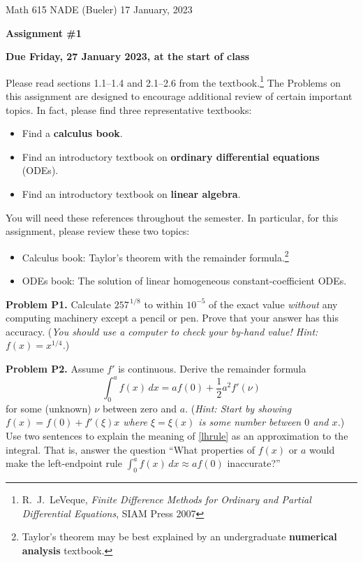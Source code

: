 \documentclass[12pt]{amsart}
\newcommand{\prob}[1]{\bigskip\noindent\textbf{#1}\quad }
\begin{document}
\scriptsize \noindent Math 615 NADE (Bueler) \hfill 17 January, 2023
\normalsize

\medskip\bigskip

\Large\centerline{\textbf{Assignment \#1}}
\large
\bigskip

\centerline{\textbf{Due Friday, 27 January 2023, at the start of class}}
\bigskip
\normalsize

\thispagestyle{empty}

\bigskip
Please read sections 1.1--1.4 and 2.1--2.6 from the textbook.\footnote{R.~J.~LeVeque, \emph{Finite Difference Methods for Ordinary and Partial Differential Equations}, SIAM Press 2007}  The Problems on this assignment are designed to encourage additional review of certain important topics.  In fact, please find three representative textbooks:
\begin{itemize}
\item Find a \textbf{calculus book}.
\item Find an introductory textbook on \textbf{ordinary differential equations} (ODEs).
\item Find an introductory textbook on \textbf{linear algebra}.
\end{itemize}
You will need these references throughout the semester.  In particular, for this assignment, please review these two topics:
\begin{itemize}
  \item[] Calculus book: Taylor's theorem with the remainder formula.\footnote{Taylor's theorem may be best explained by an undergraduate \textbf{numerical analysis} textbook.}
  \item[] ODEs book: The solution of linear homogeneous constant-coefficient ODEs.
\end{itemize}

\medskip
\prob{Problem P1.}  Calculate $257^{\,1/8}$ to within $10^{-5}$ of the exact value \emph{without} any computing machinery except a pencil or pen.    Prove that your answer has this accuracy.  (\emph{You should use a computer to \emph{check} your by-hand value!  Hint: $f(x)=x^{1/4}$.})

\prob{Problem P2.}  Assume $f'$ is continuous.  Derive the remainder formula
\begin{equation}\label{lhrule}
\int_0^a f(x)\,dx = a f(0) + \frac{1}{2} a^2 f'(\nu)
\end{equation}
for some (unknown) $\nu$ between zero and $a$.  (\emph{Hint:  Start by showing $f(x)=f(0)+f'(\xi)x$ where $\xi=\xi(x)$ is some number between $0$ and $x$.})  Use two sentences to explain the meaning of \eqref{lhrule} as an approximation to the integral.  That is, answer the question ``What properties of $f(x)$ or $a$ would make the left-endpoint rule $\int_0^a f(x)\,dx \approx a f(0)$ inaccurate?''
\end{document}
